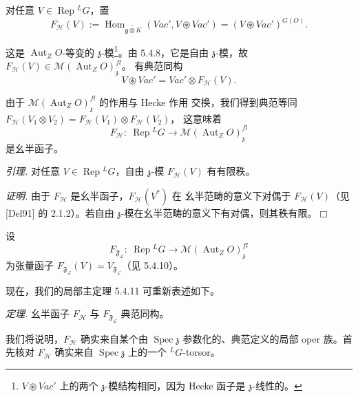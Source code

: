  对任意 $V\in\operatorname{Rep}{}^{L}G$，置
\begin{equation}\tag{284}
F_{\mathcal{H}}(V):=\operatorname{Hom}_{\widetilde{\mathfrak{g}\otimes K}}
(\mathit{Vac}',V\circledast\mathit{Vac}')=(V\circledast\mathit{Vac}')^{G(O)}.
\end{equation}

这是 $\operatorname{Aut}_ZO$-等变的 $\mathfrak{z}$-模\footnote{$V\circledast
\mathit{Vac}'$ 上的两个 $\mathfrak{z}$-模结构相同，因为 Hecke 函子是
$\mathfrak{z}$-线性的。}。由 5.4.8，它是自由 $\mathfrak{z}$-模，故
$F_{\mathcal{H}}(V)\in\mathcal{M}(\operatorname{Aut}_ZO)^{fl}_{\mathfrak{z}}$。
有典范同构
\begin{equation}\tag{285}
V\circledast\mathit{Vac}'=\mathit{Vac}'\otimes F_{\mathcal{H}}(V).
\end{equation}

由于 $\mathcal{M}(\operatorname{Aut}_ZO)^{fl}_{\mathfrak{z}}$ 的作用与 Hecke 作用
交换，我们得到典范等同
$F_{\mathcal{H}}(V_1\otimes V_2)=F_{\mathcal{H}}(V_1)\otimes F_{\mathcal{H}}(V_2)$，
这意味着
\begin{equation}\tag{286}
F_{\mathcal{H}}:\ \operatorname{Rep}{}^{L}G\to
\mathcal{M}(\operatorname{Aut}_ZO)^{fl}_{\mathfrak{z}}
\end{equation}
是幺半函子。

 \emph{引理.} 对任意 $V\in\operatorname{Rep}{}^{L}G$，自由
$\mathfrak{z}$-模 $F_{\mathcal{H}}(V)$ 有有限秩。

\emph{证明.} 由于 $F_{\mathcal{H}}$ 是幺半函子，$F_{\mathcal{H}}(V^{*})$ 在
幺半范畴的意义下对偶于 $F_{\mathcal{H}}(V)$（见 [Del91] 的 2.1.2）。若自由
$\mathfrak{z}$-模在幺半范畴的意义下有对偶，则其秩有限。\hfill$\Box$


设
\begin{equation}\tag{287}
F_{\mathfrak{F}_{\mathcal{L}}}:\ \operatorname{Rep}{}^{L}G\to
\mathcal{M}(\operatorname{Aut}_ZO)^{fl}_{\mathfrak{z}}
\end{equation}
为张量函子
$F_{\mathfrak{F}_{\mathcal{L}}}(V)=V_{\mathfrak{F}_{\mathcal{L}}}$（见 5.4.10）。

现在，我们的局部主定理 5.4.11 可重新表述如下。

 \emph{定理.} 幺半函子 $F_{\mathcal{H}}$ 与
$F_{\mathfrak{F}_{\mathcal{L}}}$ 典范同构。

我们将说明，$F_{\mathcal{H}}$ 确实来自某个由 $\operatorname{Spec}\mathfrak{z}$
参数化的、典范定义的局部 oper 族。首先核对 $F_{\mathcal{H}}$ 确实来自
$\operatorname{Spec}\mathfrak{z}$ 上的一个 ${}^{L}G$-torsor。

